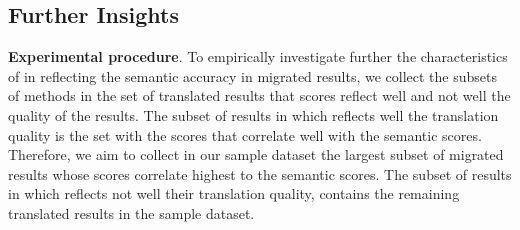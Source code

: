 \subsection{Further Insights}
\textbf{Experimental procedure}. To empirically investigate further
the characteristics of {\model} in reflecting the semantic accuracy in
migrated results, we collect the subsets of methods in the set of
translated results that {\model} scores reflect well and not well the
quality of the results. The subset of results in which {\model}
reflects well the translation quality is the set with the {\model}
scores that correlate well with the semantic scores.
%
Therefore, we aim to collect in our sample dataset the largest
subset of migrated results whose {\model} scores correlate highest to
the semantic scores. The subset of results in which {\model} reflects
not well their translation quality, contains the remaining translated results in
the sample dataset.


%


